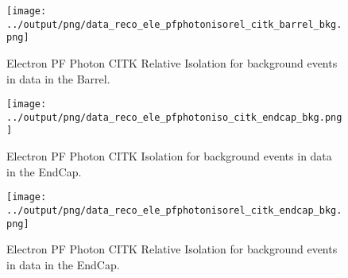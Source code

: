 \documentclass[11pt]{book}
\begin{document}
\begin{figure}[htb]
\centering
\texttt{[image: ../output/png/data\_reco\_ele\_pfphotonisorel\_citk\_barrel\_bkg.png]}
\caption{Electron PF Photon CITK Relative Isolation for background events in data in the Barrel.}
\label{fig:data_ele_pfphotonisorel_citk_barrel_bkg}
\end{figure}

\begin{figure}[htb]
\centering
\texttt{[image: ../output/png/data\_reco\_ele\_pfphotoniso\_citk\_endcap\_bkg.png]}
\caption{Electron PF Photon CITK Isolation for background events in data in the EndCap.}
\label{fig:data_ele_pfphotoniso_citk_endcap_bkg}
\end{figure}

\begin{figure}[htb]
\centering
\texttt{[image: ../output/png/data\_reco\_ele\_pfphotonisorel\_citk\_endcap\_bkg.png]}
\caption{Electron PF Photon CITK Relative Isolation for background events in data in the EndCap.}
\label{fig:data_ele_pfphotonisorel_citk_endcap_bkg}
\end{figure}
\clearpage
\end{document}
